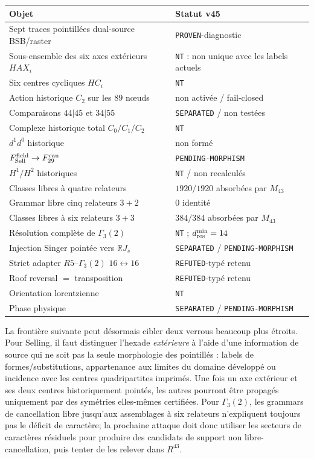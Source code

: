 \documentclass[11pt,a4paper]{article}
\newcommand{\certProven}{\texttt{PROVEN}}
\newcommand{\certRefuted}{\texttt{REFUTED}}
\newcommand{\certSeparated}{\texttt{SEPARATED}}
\newcommand{\certPending}{\texttt{PENDING-MORPHISM}}
\newcommand{\certNT}{\texttt{NT}}
\begin{document}
\begin{center}
\begin{tabularx}{\textwidth}{@{}Xl@{}}
\toprule
Objet & Statut v45\\
\midrule
Sept traces pointillées dual-source BSB/raster & \certProven{}-diagnostic\\
Sous-ensemble des six axes extérieurs $HAX_i$ & \certNT{} : non unique avec les labels actuels\\
Six centres cycliques $HC_i$ & \certNT\\
Action historique $C_2$ sur les $89$ nœuds & non activée / fail-closed\\
Comparaisons $44|45$ et $34|55$ & \certSeparated{} / non testées\\
Complexe historique total $C_0/C_1/C_2$ & \certNT\\
$d^1d^0$ historique & non formé\\
$F_{\rm Sell}^{\rm field}\to F_{29}^{\rm can}$ & \certPending\\
$H^1/H^2$ historiques & \certNT{} / non recalculés\\
Classes libres à quatre relateurs & $1920/1920$ absorbées par $M_{43}$\\
Grammar libre cinq relateurs $3+2$ & $0$ identité\\
Classes libres à six relateurs $3+3$ & $384/384$ absorbées par $M_{43}$\\
Résolution complète de $\Gamma_3(2)$ & \certNT{} ; $d_{\rm res}^{\min}=14$\\
Injection Singer pointée vers $\mathbb RJ_s$ & \certSeparated{} / \certPending\\
Strict adapter $R5$--$\Gamma_3(2)$ $16\leftrightarrow16$ & \certRefuted{}-typé retenu\\
Roof reversal $=$ transposition & \certRefuted{}-typé retenu\\
Orientation lorentzienne & \certNT\\
Phase physique & \certSeparated{} / \certPending\\
\bottomrule
\end{tabularx}
\end{center}

La frontière suivante peut désormais cibler deux verrous beaucoup plus étroits. Pour Selling, il faut distinguer l'hexade \emph{extérieure} à l'aide d'une information de source qui ne soit pas la seule morphologie des pointillés : labels de formes/substitutions, appartenance aux limites du domaine développé ou incidence avec les centres quadripartites imprimés. Une fois un axe extérieur et ses deux centres historiquement pointés, les autres pourront être propagés uniquement par des symétries elles-mêmes certifiées. Pour $\Gamma_3(2)$, les grammars de cancellation libre jusqu'aux assemblages à six relateurs n'expliquent toujours pas le déficit de caractère; la prochaine attaque doit donc utiliser les secteurs de caractères résiduels pour produire des candidats de support non libre-cancellation, puis tenter de les relever dans $R^{43}$.
\end{document}

